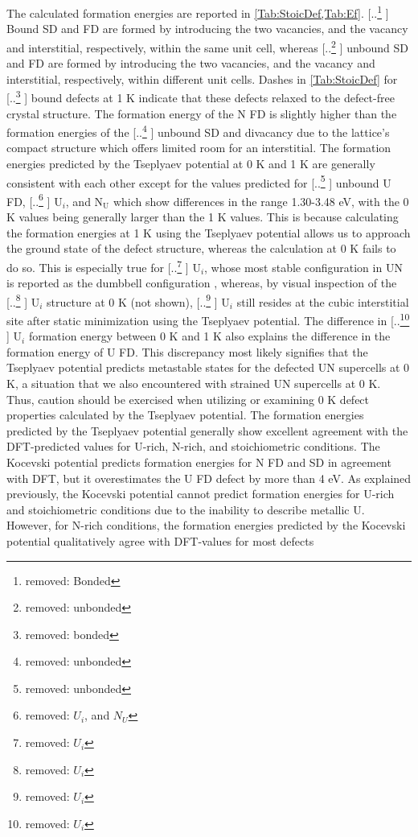 \documentclass[preprint, 12pt]{elsarticle}
\providecommand{\DIFaddtex}[1]{{\protect\color{blue} \sf #1}} %
\providecommand{\DIFdeltex}[1]{{\protect\color{red} [..\footnote{removed: #1} ]}} %
\providecommand{\DIFaddbegin}{} %
\providecommand{\DIFaddend}{} %
\providecommand{\DIFdelbegin}{} %
\providecommand{\DIFdelend}{} %
\providecommand{\DIFadd}[1]{\texorpdfstring{\DIFaddtex{#1}}{#1}} %
\providecommand{\DIFdel}[1]{\texorpdfstring{\DIFdeltex{#1}}{}} %
\newcommand{\DIFscaledelfig}{0.5}
\newlength{\DIFdelgraphicswidth} %
\newlength{\DIFdelgraphicsheight} %
\newcommand{\DIFaddincludegraphics}[2][]{{\color{blue}\fbox{\DIFOincludegraphics[#1]{#2}}}} %
\newcommand{\DIFdelincludegraphics}[2][]{%
\sbox{\DIFdelgraphicsbox}{\DIFOincludegraphics[#1]{#2}}%
\settoboxwidth{\DIFdelgraphicswidth}{\DIFdelgraphicsbox} %
\settoboxtotalheight{\DIFdelgraphicsheight}{\DIFdelgraphicsbox} %
\scalebox{\DIFscaledelfig}{%
\parbox[b]{\DIFdelgraphicswidth}{\usebox{\DIFdelgraphicsbox}\\[-\baselineskip] \rule{\DIFdelgraphicswidth}{0em}}\llap{\resizebox{\DIFdelgraphicswidth}{\DIFdelgraphicsheight}{%
\setlength{\unitlength}{\DIFdelgraphicswidth}%
\begin{picture}(1,1)%
\thicklines\linethickness{2pt} %
{\color[rgb]{1,0,0}\put(0,0){\framebox(1,1){}}}%
{\color[rgb]{1,0,0}\put(0,0){\line( 1,1){1}}}%
{\color[rgb]{1,0,0}\put(0,1){\line(1,-1){1}}}%
\end{picture}%
}\hspace*{3pt}}} %
} %
\DeclareRobustCommand{\DIFaddbegin}{\DIFOaddbegin \let\includegraphics\DIFaddincludegraphics} %
\DeclareRobustCommand{\DIFaddend}{\DIFOaddend \let\includegraphics\DIFOincludegraphics} %
\DeclareRobustCommand{\DIFdelbegin}{\DIFOdelbegin \let\includegraphics\DIFdelincludegraphics} %
\DeclareRobustCommand{\DIFdelend}{\DIFOaddend \let\includegraphics\DIFOincludegraphics} %
\begin{document}
The calculated formation energies are reported in \cref{Tab:StoicDef,Tab:Ef}. \DIFdelbegin \DIFdel{Bonded }\DIFdelend \DIFaddbegin \DIFadd{Bound }\DIFaddend SD and FD are formed by introducing the two vacancies, and the vacancy and interstitial, respectively, within the same unit cell, whereas \DIFdelbegin \DIFdel{unbonded }\DIFdelend \DIFaddbegin \DIFadd{unbound }\DIFaddend SD and FD are formed by introducing the two vacancies, and the vacancy and interstitial, respectively, within different unit cells. Dashes in \cref{Tab:StoicDef} for \DIFdelbegin \DIFdel{bonded }\DIFdelend \DIFaddbegin \DIFadd{bound }\DIFaddend defects at 1 K indicate that these defects relaxed to the defect-free crystal structure. The formation energy of the N FD is slightly higher than the formation energies of the \DIFdelbegin \DIFdel{unbonded }\DIFdelend \DIFaddbegin \DIFadd{unbound }\DIFaddend SD and divacancy due to the lattice's compact structure which offers limited room for an interstitial. The formation energies predicted by the Tseplyaev potential at 0 K and 1 K are generally consistent with each other except for the values predicted for \DIFdelbegin \DIFdel{unbonded }\DIFdelend \DIFaddbegin \DIFadd{unbound }\DIFaddend U FD, \DIFdelbegin \DIFdel{$U_i$, and $N_U$ }\DIFdelend \DIFaddbegin \DIFadd{U$_i$, and N$_\text{U}$ }\DIFaddend which show differences in the range 1.30-3.48 eV, with the 0 K values being generally larger than the 1 K values. This is because calculating the formation energies at 1 K using the Tseplyaev potential allows us to approach the ground state of the defect structure, whereas the calculation at 0 K fails to do so. This is especially true for \DIFdelbegin \DIFdel{$U_i$}\DIFdelend \DIFaddbegin \DIFadd{U$_i$}\DIFaddend , whose most stable configuration in UN is reported as the dumbbell configuration \cite{Kuksin2016}, whereas, by visual inspection of the \DIFdelbegin \DIFdel{$U_i$ }\DIFdelend \DIFaddbegin \DIFadd{U$_i$ }\DIFaddend structure at 0 K (not shown), \DIFdelbegin \DIFdel{$U_i$ }\DIFdelend \DIFaddbegin \DIFadd{U$_i$ }\DIFaddend still resides at the cubic interstitial site after static minimization using the Tseplyaev potential. The difference in \DIFdelbegin \DIFdel{$U_i$ }\DIFdelend \DIFaddbegin \DIFadd{U$_i$ }\DIFaddend formation energy between 0 K and 1 K also explains the difference in the formation energy of U FD. This discrepancy most likely signifies that the Tseplyaev potential predicts metastable states for the defected UN supercells at 0 K, a situation that we also encountered with strained UN supercells at 0 K. Thus, caution should be exercised when utilizing or examining 0 K defect properties calculated by the Tseplyaev potential. The formation energies predicted by the Tseplyaev potential generally show excellent agreement with the DFT-predicted values for U-rich, N-rich, and stoichiometric conditions. The Kocevski potential predicts formation energies for N FD and SD in agreement with DFT, but it overestimates the U FD defect by more than 4 eV. As explained previously, the Kocevski potential cannot predict formation energies for U-rich and stoichiometric conditions due to the inability to describe metallic U. However, for N-rich conditions, the formation energies predicted by the Kocevski potential qualitatively agree with DFT-values for most defects 
\end{document}
